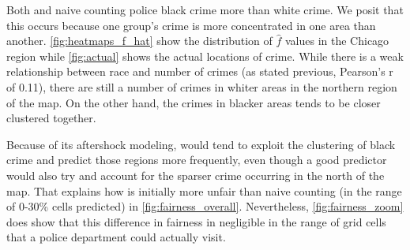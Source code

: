 Both \pp and naive counting police black crime more than white crime. We posit that this occurs because one group's crime is more concentrated in one area than another. \autoref{fig:heatmaps_f_hat} show the distribution of $\hat{f}$ values in the Chicago region while \autoref{fig:actual} shows the actual locations of crime. While there is a weak relationship between race and number of crimes (as stated previous, Pearson's r of 0.11), there are still a number of crimes in whiter areas in the northern region of the map. On the other hand, the crimes in blacker areas tends to be closer clustered together.

Because of its aftershock modeling, \pp would tend to exploit the clustering of black crime and predict those regions more frequently, even though a good predictor would also try and account for the sparser crime occurring in the north of the map. That explains how \pp is initially more unfair than naive counting (in the range of 0-30\% cells predicted) in \autoref{fig:fairness_overall}. Nevertheless, \autoref{fig:fairness_zoom} does show that this difference in fairness in negligible in the range of grid cells that a police department could actually visit.

